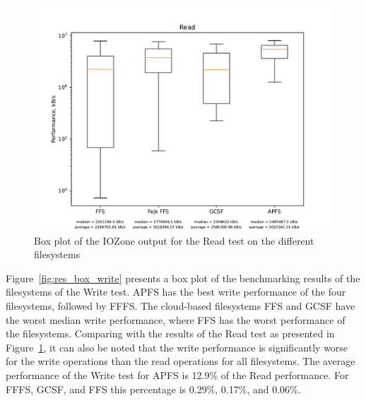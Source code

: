 \begin{figure}[!ht]
	\label{fig:res_box_read}
	\begin{center}
		\includegraphics[width=1.0\textwidth]{figures/benchmarking/Read_box.pdf}
	\end{center}
	\caption{Box plot of the IOZone output for the Read test on the different filesystems}
\end{figure}

\FloatBarrier

Figure~\ref{fig:res_box_write} presents a box plot of the benchmarking results of the filesystems of the Write test. \gls{APFS} has the best write performance of the four filesystems, followed by \gls{FFFS}. The cloud-based filesystems \gls{FFS} and \gls{GCSF} have the worst median write performance, where \gls{FFS} has the worst performance of the filesystems. Comparing with the results of the Read test as presented in Figure~\ref{fig:res_box_read}, it can also be noted that the write performance is significantly worse for the write operations than the read operations for all filesystems. The average performance of the Write test for \gls{APFS} is 12.9\% of the Read performance. For \gls{FFFS}, \gls{GCSF}, and \gls{FFS} this percentage is 0.29\%, 0.17\%, and 0.06\%.

